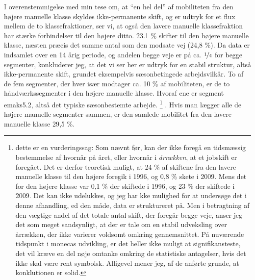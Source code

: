 \begin{landscape}
I overenstemmigelse med min tese om, at “en hel del” af mobiliteten fra den højere manuelle klasse skyldes ikke-permanente skift, og er udtryk for et flux mellem de to klassefraktioner, ser vi, at også den lavere manuelle klassefraktion har stærke forbindelser til den højere ditto. 23.1 \% skifter til den højere manuelle klasse,  næsten præcis det samme antal som den modsate vej (24,8 \%). %
Da data er indsamlet over en 14 årig periode, og andelen begge veje er på ca. $\nicefrac{1}{4}$ for begge segmenter, konkluderer jeg, at det vi ser her er udtryk for en stabil struktur, altså ikke-permanente skift, grundet eksempelvis sæsonbetingede arbejdsvilkår. To af de fem segmenter, der hver især modtager ca. 10 \% af mobiliteten, er de to håndværkssegmenter i den højere manuelle klasse. Hvoraf ene er segment emak{s5.2}, altså det typiske sæsonbestemte arbejde.
%
    \footnote{ dette er en vurderingssag: Som nævnt før, kan der ikke foregå en tidsmæssig bestemmelse af hvornår på året, eller hvornår i \emph{årrækken}, at et jobskift er foregået. Det er derfor teoretisk muligt, at 24 \% af skiftene fra den lavere manuelle klasse til den højere foregik i 1996, og 0,8 \% skete i 2009. Mens det for den højere klasse var 0,1 \% der skiftede i 1996, og 23 \% der skiftede i 2009. Det kan ikke udelukkes, og jeg har  kke mulighed for at undersøge det i denne afhandling, ed den måde, data er struktureret på. %
    Men i betragtning af den vægtige andel af det totale antal skift, der foregår begge veje, anser jeg det som meget sandsynligt, at der er tale om en stabil udveksling over årrækken, der ikke varierer voldsomt omkring gennemsnittet. På nuværende tidspunkt i monecas udvikling, er det heller ikke muligt at signifikansteste, det vil kræve en del nøje omtanke omkring de statistiske antagelser, hvis det ikke skal være rent symbolsk. Alligevel mener jeg, af de anførte grunde, at konklutionen er solid.}%
%
.  Hvis man lægger alle de højere manuelle segmenter sammen, er den samlede mobilitet fra den lavere manuelle klasse 29,5 \%.







\end{landscape}
